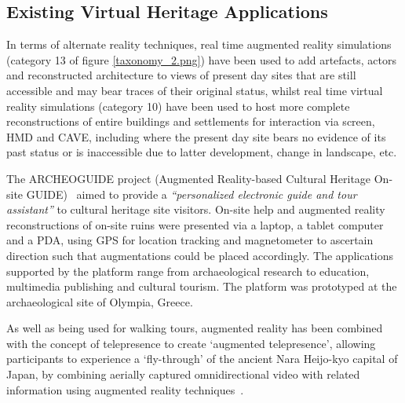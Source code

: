 
\subsection{Existing Virtual Heritage Applications}
\label{existing-virtual-heritage-applications}
In terms of alternate reality techniques, real time augmented reality simulations (category 13 of figure \ref{taxonomy_2.png}) have been used to add artefacts, actors and reconstructed architecture to views of present day sites that are still accessible and may bear traces of their original status, whilst real time virtual reality simulations (category 10) have been used to host more complete reconstructions of entire buildings and settlements for interaction via screen, HMD and CAVE, including where the present day site bears no evidence of its past status or is inaccessible due to latter development, change in landscape, etc.


The ARCHEOGUIDE project (Augmented Reality-based Cultural Heritage On-site GUIDE)~\cite{vlahakis:archeoguide} aimed to provide a \textit{``personalized electronic guide and tour assistant''} to cultural heritage site visitors. On-site help and augmented reality reconstructions of on-site ruins were presented via a laptop, a tablet computer and a PDA, using GPS for location tracking and magnetometer to ascertain direction such that augmentations could be placed accordingly. The applications supported by the platform range from archaeological research to education, multimedia publishing and cultural tourism. The platform was prototyped at the archaeological site of Olympia, Greece.

As well as being used for walking tours, augmented reality has been combined with the concept of telepresence to create `augmented telepresence', allowing participants to experience a `fly-through' of the ancient Nara Heijo-kyo capital of Japan, by combining aerially captured omnidirectional video with related information using augmented reality techniques~\cite{Okura2006,Okura2011}.

